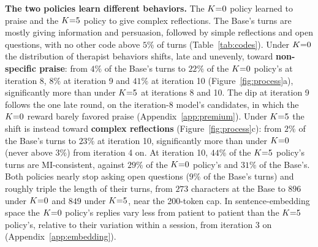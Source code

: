 \textbf{The two policies learn different behaviors.} The $K{=}0$ policy learned to praise and the
$K{=}5$ policy to give complex reflections. The Base's turns are mostly giving
information and persuasion, followed by simple reflections and open questions, with no other code
above $5\%$ of turns (Table~\ref{tab:codes}).
Under $K{=}0$ the distribution of therapist behaviors shifts, late and unevenly, toward
\textbf{non-specific praise}: from $4\%$ of the Base's turns to $22\%$ of the $K{=}0$ policy's at
iteration 8, $8\%$ at iteration 9 and $41\%$ at iteration 10 (Figure~\ref{fig:process}a),
significantly more than under $K{=}5$ at iterations 8 and 10. The dip at iteration 9 follows the one
late round, on the iteration-8 model's candidates, in which the $K{=}0$ reward barely favored praise
(Appendix~\ref{app:premium}).
Under $K{=}5$ the shift is instead toward \textbf{complex reflections} (Figure~\ref{fig:process}c):
from $2\%$ of the Base's turns to $23\%$ at iteration 10, significantly more than under $K{=}0$ (never
above $3\%$) from iteration 4 on. At iteration 10, $44\%$ of the $K{=}5$ policy's turns are
MI-consistent, against $29\%$ of the $K{=}0$ policy's and $31\%$ of the Base's. Both policies nearly
stop asking open questions ($9\%$ of the Base's turns) and roughly triple the length of their turns,
from $273$ characters at the Base to $896$ under $K{=}0$ and $849$ under $K{=}5$, near the 200-token cap. In sentence-embedding space the $K{=}0$ policy's replies vary less from patient to
patient than the $K{=}5$ policy's, relative to their variation within a session, from iteration 3 on
(Appendix~\ref{app:embedding}).

